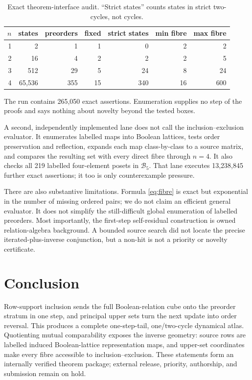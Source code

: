 \documentclass[10pt,a4paper]{amsart}
\theoremstyle{definition}
\theoremstyle{remark}
\newcommand{\B}{\mathcal B}
\begin{document}
\begin{table}[ht]
\centering
\caption{Exact theorem-interface audit.  ``Strict states'' counts states in
strict two-cycles, not cycles.}
\label{tab:audit}
\begin{tabular}{rrrrrrr}
\toprule
$n$ & states & preorders & fixed & strict states & min fibre & max fibre\\
\midrule
1 & 2 & 1 & 1 & 0 & 2 & 2\\
2 & 16 & 4 & 2 & 2 & 2 & 5\\
3 & 512 & 29 & 5 & 24 & 8 & 24\\
4 & 65,536 & 355 & 15 & 340 & 16 & 600\\
\bottomrule
\end{tabular}
\end{table}

The run contains 265,050 exact assertions.  Enumeration supplies no step of
the proofs and says nothing about novelty beyond the tested boxes.

A second, independently implemented lane does not call the
inclusion--exclusion evaluator.  It enumerates labelled maps into Boolean
lattices, tests order preservation and reflection, expands each map
class-by-class to a source matrix, and compares the resulting set with every
direct fibre through $n=4$.  It also checks all 219 labelled four-element
posets in $\B_5$.  That lane executes 13,238,845 further exact assertions;
it too is only counterexample pressure.

There are also substantive limitations.  Formula \eqref{eq:fibre} is exact
but exponential in the number of missing ordered pairs; we do not claim an
efficient general evaluator.  It does not simplify the still-difficult
global enumeration of labelled preorders.  Most importantly, the first-step
self-residual construction is owned relation-algebra background.  A bounded
source search did not locate the precise iterated-plus-inverse conjunction,
but a non-hit is not a priority or novelty certificate.

\section{Conclusion}

Row-support inclusion sends the full Boolean-relation cube onto the preorder
stratum in one step, and principal upper sets turn the next update into order
reversal.  This produces a complete one-step-tail, one/two-cycle dynamical
atlas.  Quotienting mutual comparability exposes the inverse geometry:
source rows are labelled induced Boolean-lattice representation maps, and upper-set
coordinates make every fibre accessible to inclusion--exclusion.  These
statements form an internally verified theorem package; external release,
priority, authorship, and submission remain on hold.



\end{document}
